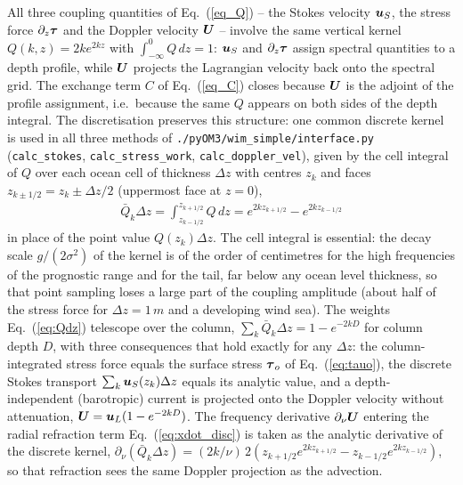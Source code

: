 \documentclass[12pt]{article}
\newcommand{\beq}  { \begin{eqnarray} }
\newcommand{\eeq}  { \end{eqnarray}}
\newcommand{\eq }  [1]{Eq.~(\ref{#1})}  %
\renewcommand{\v}[1]{{\mbox{\boldmath$ #1 $}}}  %
\newcommand{\p}{{\partial}}
\begin{document}
All three coupling quantities of \eq{eq_Q} -- the Stokes velocity $\v u_S$,
the stress force $\p_z \v \tau$ and the Doppler velocity $\v U$ -- involve the
same vertical kernel $Q(k,z) = 2 k e^{2kz}$ with $\int_{-\infty}^0 Q \, dz =
1$: $\v u_S$ and $\p_z \v \tau$ assign spectral quantities to a depth profile,
while $\v U$ projects the Lagrangian velocity back onto the spectral grid. The
exchange term $C$ of \eq{eq_C} closes because $\v U$ is the adjoint of the
profile assignment, i.e.\ because the same $Q$ appears on both sides of the
depth integral. The discretisation preserves this structure: one common
discrete kernel is used in all three methods of
\verb|./pyOM3/wim_simple/interface.py| (\verb|calc_stokes|, \verb|calc_stress_work|,
\verb|calc_doppler_vel|), given by the cell integral of $Q$ over each ocean
cell of thickness $\Delta z$ with centres $z_k$ and faces $z_{k \pm 1/2} = z_k
\pm \Delta z/2$ (uppermost face at $z=0$),
\beq \label{eq:Qdz}
 \bar Q_k \Delta z = \int_{z_{k-1/2}}^{z_{k+1/2}} Q \, dz 
 = e^{2 k z_{k+1/2}} - e^{2 k z_{k-1/2}} 
\eeq
in place of the point value $Q(z_k) \Delta z$. The cell integral is essential:
the decay scale $g/(2\sigma^2)$ of the kernel is of the order of centimetres
for the high frequencies of the prognostic range and for the tail, far below
any ocean level thickness, so that point sampling loses a large part of the
coupling amplitude (about half of the stress force for $\Delta z = 1 \, m$ and
a developing wind sea). The weights \eq{eq:Qdz} telescope over the column,
$\sum_k \bar Q_k \Delta z = 1 - e^{-2 k D}$ for column depth $D$, with three
consequences that hold exactly for any $\Delta z$: the column-integrated
stress force equals the surface stress $\v \tau_o$ of \eq{eq:tauo}, the
discrete Stokes transport $\sum_k \v u_S(z_k) \Delta z$ equals its analytic
value, and a depth-independent (barotropic) current is projected onto the
Doppler velocity without attenuation, $\v U = \v u_L (1 - e^{-2kD})$. The
frequency derivative $\p_\nu \v U$ entering the radial refraction term
\eq{eq:xdot_disc} is taken as the analytic derivative of the discrete kernel,
$\p_\nu (\bar Q_k \Delta z) = (2k/\nu) \, 2 ( z_{k+1/2} e^{2 k z_{k+1/2}} -
z_{k-1/2} e^{2 k z_{k-1/2}} )$, so that refraction sees the same Doppler
projection as the advection.
\end{document}
